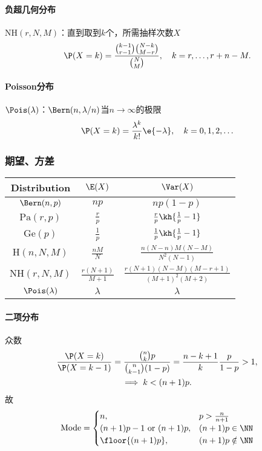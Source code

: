 \paragraph{负超几何分布}$\mathrm{NH}(r,N,M)$：直到取到$k$个，所需抽样次数$X$
\begin{align}
	\P(X=k)=\frac{{k-1\choose r-1}{N-k\choose M-r}}{{N\choose M}},\quad k=r,\ldots,r+n-M.
\end{align}
\paragraph{Poisson分布}$\Pois(\lambda)$：$\Bern(n,\lambda/n)$当$n\to\infty$的极限
\begin{align}
	\P(X=k)=\frac{\lambda^k}{k!}\e{-\lambda},\quad k=0,1,2,\ldots
\end{align}
\subsubsection{期望、方差}
\begin{center}
	\begin{tabular}{c|c|c}
		\toprule
		Distribution&$\E(X)$&$\Var(X)$\\
		\midrule
		$\Bern(n,p)$&$np$&$np(1-p)$\\
		\midrule
		$\mathrm{Pa}(r,p)$&$\frac rp$&$\frac rp\kh{\frac1p-1}$\\
		\midrule
		$\mathrm{Ge}(p)$&$\frac1p$&$\frac1p\kh{\frac1p-1}$\\
		\midrule
		$\mathrm H(n,N,M)$&$\frac{nM}N$&$\frac{n(N-n)M(N-M)}{N^2(N-1)}$\\
		\midrule
		$\mathrm{NH}(r,N,M)$&$\frac{r(N+1)}{M+1}$&$\frac{r(N+1)(N-M)(M-r+1)}{(M+1)^2(M+2)}$\\
		\midrule
		$\Pois(\lambda)$&$\lambda$&$\lambda$\\
		\bottomrule
	\end{tabular}
\end{center}
\paragraph{二项分布}众数
\begin{gather*}
	\frac{\P(X=k)}{\P(X=k-1)}=\frac{{n\choose k}p}{{n\choose k-1}(1-p)}=\frac{n-k+1}{k}\frac p{1-p}>1,\\
	\implies k<(n+1)p.
\end{gather*}
故
\begin{align*}
	\text{Mode}=\begin{cases}
		n,&p>\frac{n}{n+1}\\
		(n+1)p-1\text{~or~}(n+1)p,&(n+1)p\in\NN\\
		\floor{(n+1)p},&(n+1)p\notin\NN
	\end{cases}
\end{align*}

